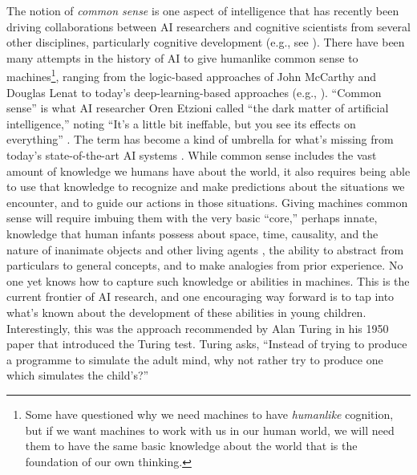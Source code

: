 \documentclass{article}
\begin{document}
The notion of \textit{common sense} is one aspect of intelligence that has recently been driving collaborations between AI researchers and cognitive scientists from several other disciplines, particularly cognitive development (e.g., see \cite{DARPA}).  There have been many attempts in the history of AI to give humanlike common sense to machines\footnote{Some have questioned why we need machines to have   \textit{humanlike} cognition, but if we want machines to work with   us in our human world, we will need them to have the same basic   knowledge about the world that is the foundation of our own   thinking.}, ranging from the logic-based approaches of John McCarthy \cite{McCarthy1986} and Douglas Lenat \cite{Lenat1990} to today's deep-learning-based approaches (e.g., \cite{Zellers2019}).  ``Common sense'' is what AI researcher Oren Etzioni called ``the dark matter of artificial intelligence,'' noting ``It's a little bit ineffable, but you see its effects on everything'' \cite{Knight2018}. The term has become a kind of umbrella for what's missing from today's state-of-the-art AI systems \cite{Davis2015,Levesque2017}.  While common sense includes the vast amount of knowledge we humans have about the world, it also requires being able to use that knowledge to recognize and make predictions about the situations we encounter, and to guide our actions in those situations.  Giving machines common sense will require imbuing them with the very basic ``core,'' perhaps innate, knowledge that human infants possess about space, time, causality, and the nature of inanimate objects and other living agents \cite{Spelke2007}, the ability to abstract from particulars to general concepts, and to make analogies from prior experience.  No one yet knows how to capture such knowledge or abilities in machines. This is the current frontier of AI research, and one encouraging way forward is to tap into what's known about the development of these abilities in young children.  Interestingly, this was the approach recommended by Alan Turing in his 1950 paper that introduced the Turing test.  Turing asks, ``Instead of trying to produce a programme to simulate the adult mind, why not rather try to produce one which simulates the child's?'' \cite{Turing1950}
\end{document}
